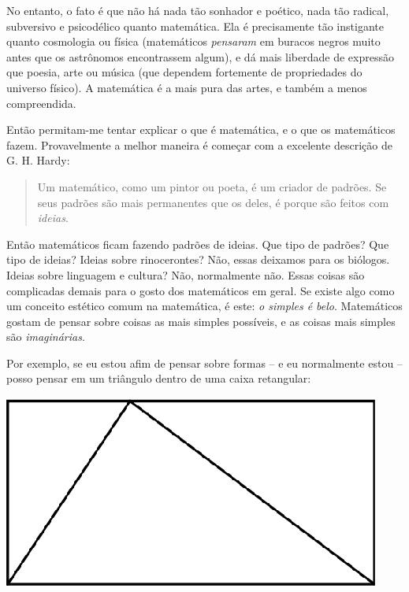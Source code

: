 \documentclass[a4paper,oneside,12pt,notitlepage]{article}
\begin{document}
No entanto, o fato é que não há nada tão sonhador e poético, nada tão radical, subversivo e psicodélico quanto matemática.
Ela é precisamente tão instigante quanto cosmologia ou física (matemáticos \textsl{pensaram} em buracos negros muito antes que os astrônomos encontrassem algum), e dá mais liberdade de expressão que poesia, arte ou música (que dependem fortemente de propriedades do universo físico).
A matemática é a mais pura das artes, e também a menos compreendida.

Então permitam-me tentar explicar o que é matemática, e o que os matemáticos fazem.
Provavelmente a melhor maneira é começar com a excelente descrição de G. H. Hardy:

\begin{quote}
Um matemático, como um pintor ou poeta, é um criador de padrões.
Se seus padrões são mais permanentes que os deles, é porque são feitos com \textsl{ideias}.
\end{quote}

Então matemáticos ficam fazendo padrões de ideias.
Que tipo de padrões? Que tipo de ideias?
Ideias sobre rinocerontes? Não, essas deixamos para os biólogos.
Ideias sobre linguagem e cultura? Não, normalmente não.
Essas coisas são complicadas demais para o gosto dos matemáticos em geral.
Se existe algo como um conceito estético comum na matemática, é este: \textsl{o simples é belo}.
Matemáticos gostam de pensar sobre coisas as mais simples possíveis, e as coisas mais simples são \textsl{imaginárias}.

Por exemplo, se eu estou afim de pensar sobre formas -- e eu normalmente estou -- posso pensar em um triângulo dentro de uma caixa retangular:

\begin{center}
\includegraphics{triangle0.eps}
\end{center}
\end{document}
